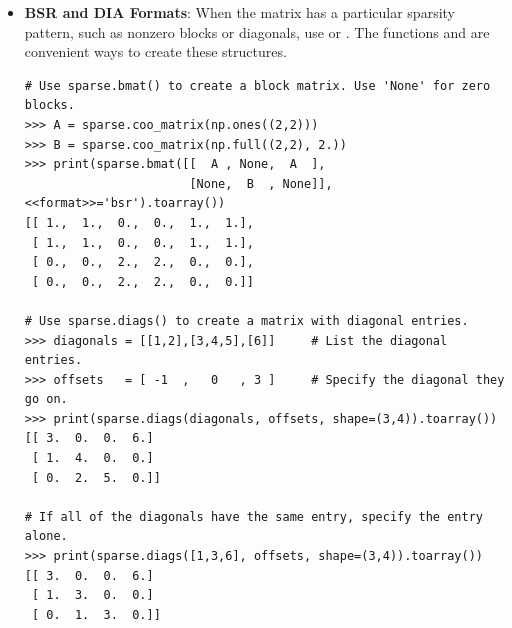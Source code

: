 \begin{itemize}

\item \textbf{BSR and DIA Formats}:
When the matrix has a particular sparsity pattern, such as nonzero blocks or diagonals, use  or .
The functions  and  are convenient ways to create these structures.

\begin{lstlisting}
# Use sparse.bmat() to create a block matrix. Use 'None' for zero blocks.
>>> A = sparse.coo_matrix(np.ones((2,2)))
>>> B = sparse.coo_matrix(np.full((2,2), 2.))
>>> print(sparse.bmat([[  A , None,  A  ],
                       [None,  B  , None]], <<format>>='bsr').toarray())
[[ 1.,  1.,  0.,  0.,  1.,  1.],
 [ 1.,  1.,  0.,  0.,  1.,  1.],
 [ 0.,  0.,  2.,  2.,  0.,  0.],
 [ 0.,  0.,  2.,  2.,  0.,  0.]]

# Use sparse.diags() to create a matrix with diagonal entries.
>>> diagonals = [[1,2],[3,4,5],[6]]     # List the diagonal entries.
>>> offsets   = [ -1  ,   0   , 3 ]     # Specify the diagonal they go on.
>>> print(sparse.diags(diagonals, offsets, shape=(3,4)).toarray())
[[ 3.  0.  0.  6.]
 [ 1.  4.  0.  0.]
 [ 0.  2.  5.  0.]]

# If all of the diagonals have the same entry, specify the entry alone.
>>> print(sparse.diags([1,3,6], offsets, shape=(3,4)).toarray())
[[ 3.  0.  0.  6.]
 [ 1.  3.  0.  0.]
 [ 0.  1.  3.  0.]]
\end{lstlisting}

\end{itemize}

